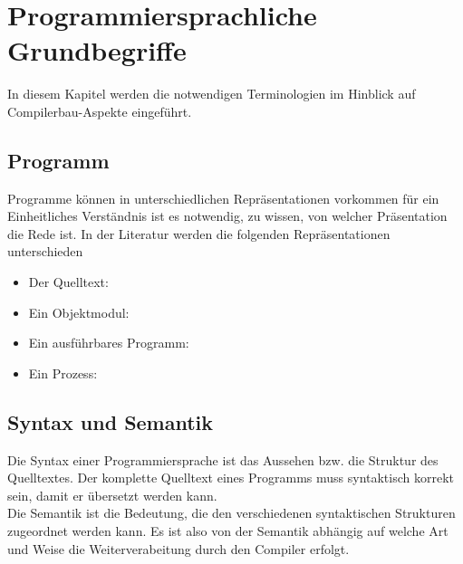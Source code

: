 \chapter{Programmiersprachliche Grundbegriffe}
In diesem Kapitel werden die notwendigen Terminologien im Hinblick auf Compilerbau-Aspekte eingeführt.
\section{ Programm}
Programme können in unterschiedlichen Repräsentationen vorkommen für ein Einheitliches Verständnis ist es notwendig, zu wissen, von welcher Präsentation die Rede ist. In der Literatur werden die folgenden Repräsentationen unterschieden
\begin{itemize}
\item Der Quelltext:
\item Ein Objektmodul:
\item Ein ausführbares Programm:
\item Ein Prozess:
\end{itemize}

\section{ Syntax und Semantik}
Die Syntax einer Programmiersprache ist das Aussehen bzw. die Struktur des Quelltextes. Der komplette Quelltext eines Programms muss syntaktisch korrekt sein, damit er übersetzt werden kann.  \\
Die Semantik ist die Bedeutung, die den verschiedenen syntaktischen Strukturen zugeordnet werden kann. Es ist also von der Semantik abhängig auf welche Art und Weise die Weiterverabeitung durch den Compiler erfolgt. 

